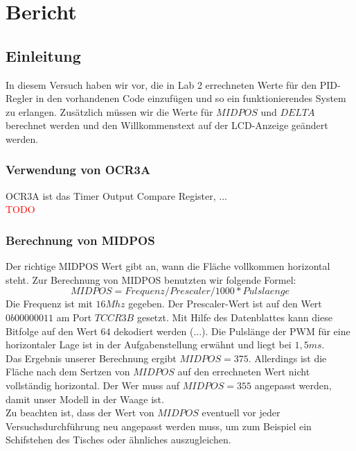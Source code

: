 \section{Bericht}

\subsection{Einleitung}
In diesem Versuch haben wir vor, die in Lab 2 errechneten Werte für den PID-Regler in den vorhandenen Code einzufügen und so ein funktionierendes System zu erlangen. Zusätzlich müssen wir die Werte für $MIDPOS$ und $DELTA$ berechnet werden und den Willkommenstext auf der LCD-Anzeige geändert werden.

\subsubsection{Verwendung von OCR3A}
OCR3A ist das Timer Output Compare Register, ...\\
\textcolor{red}{TODO}

\subsubsection{Berechnung von MIDPOS}
Der richtige MIDPOS Wert gibt an, wann die Fläche vollkommen horizontal steht. Zur Berechnung von MIDPOS benutzten wir folgende Formel: \\
\begin{equation}
MIDPOS  = Frequenz / Prescaler / 1000 * Pulslaenge
\end{equation}
Die Frequenz ist mit $16 Mhz$ gegeben. Der Prescaler-Wert ist auf den Wert $0b00000011$ am Port $TCCR3B$ gesetzt. Mit Hilfe des Datenblattes kann diese Bitfolge auf den Wert $64$ dekodiert werden (...). Die Pulslänge der PWM für eine horizontaler Lage ist in der Aufgabenstellung erwähnt und liegt bei $1,5 ms$.\\
Das Ergebnis unserer Berechnung ergibt $MIDPOS = 375$. Allerdings ist die Fläche nach dem Sertzen von $MIDPOS$ auf den errechneten Wert nicht vollständig horizontal. Der Wer muss auf $MIDPOS = 355$ angepasst werden, damit unser Modell in der Waage ist. \\ 
Zu beachten ist, dass der Wert von $MIDPOS$ eventuell vor jeder Versuchsdurchführung neu angepasst werden muss, um zum Beispiel ein Schifstehen des Tisches oder ähnliches auszugleichen.

